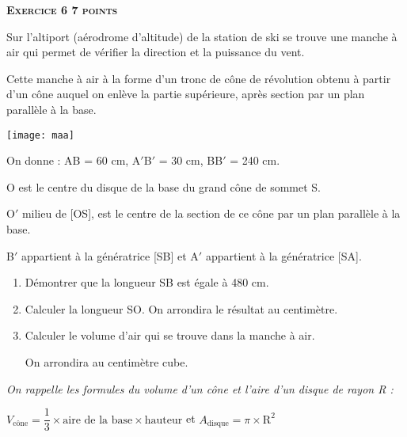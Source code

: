 \textbf{\textsc{Exercice 6 \hfill 7 points}}

\medskip

Sur l'altiport (aérodrome d'altitude) de la station de ski se trouve une manche à air qui permet de vérifier la direction et la puissance du vent.

Cette manche à air à la forme d'un tronc de cône de révolution obtenu à partir d'un cône auquel on enlève la partie supérieure, après section par un plan parallèle à la base.

\texttt{[image: maa]} %
\hfill
{}

On donne : AB = 60 cm, A$'$B$'$ = 30 cm, BB$'$ = 240 cm.

O est le centre du disque de la base du grand cône de sommet S.

O$'$ milieu de [OS], est le centre de la section de ce cône par un plan parallèle à la base.

B$'$ appartient à la génératrice [SB] et A$'$ appartient à la génératrice [SA].

\begin{enumerate}
	\item Démontrer que la longueur SB est égale à 480 cm.
	
	\item Calculer la longueur SO. On arrondira le résultat au centimètre.
	
	\item Calculer le volume d'air qui se trouve dans la manche à air.
	
On arrondira au centimètre cube.
\end{enumerate}

\emph{On rappelle les formules du volume d'un cône et l'aire d'un disque de rayon R :}

\hfill $V_{\mathrm{cône}} = \dfrac{1}{3} \times \text{aire de la base} \times \text{hauteur}$ \hfill et \hfill $A_{\mathrm{disque}} = \pi \times \text{R}^2$\hfill ~

\vspace{0,5cm}

